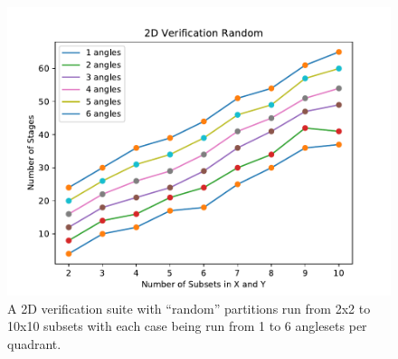 \begin{figure}[H]
\centering
\includegraphics[scale=0.8]{../figures/random_verification.pdf}
\caption{A 2D verification suite with ``random'' partitions run from 2x2 to 10x10 subsets with each case being run from 1 to 6 anglesets per quadrant.}
\label{random_verification}
\end{figure}

